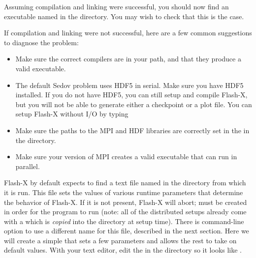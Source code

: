 Assuming compilation and linking were successful, you should now
find an executable named  in the 
directory. You may wish to check that this is the case.


If compilation and linking were not successful, here are a few common
suggestions to diagnose the problem:
\begin{itemize}

\item Make sure the correct compilers are in your path, and that they
produce a valid executable.

\item The default Sedov problem uses HDF5 in serial.  Make sure you
  have HDF5 installed. If you do not have HDF5, you can still setup
  and compile Flash-X, but you will not be able to generate either a
  checkpoint or a plot file.  You can setup Flash-X without I/O by
  typing
  \begin{quote}
  \end{quote}

\item Make sure the paths to the MPI and HDF libraries are correctly set
  in the  in the  directory.

\item Make sure your version of MPI creates a valid executable that
  can run in parallel.

\end{itemize}


Flash-X by default expects to find a text file named
in the directory
from which it is run. This file sets the values of various runtime
parameters that determine the behavior of Flash-X. If it is not
present, Flash-X will abort;  must be created in order
for the program to run (note: all of the distributed setups already
come with a  which is \emph{copied} into the
 directory at setup time).  There is command-line option to use a
different name for this file, described in the next section. Here we
will create a simple  that sets a few parameters and
allows the rest to take on default values. With your text editor,
edit the  in the  directory so it looks
like .

